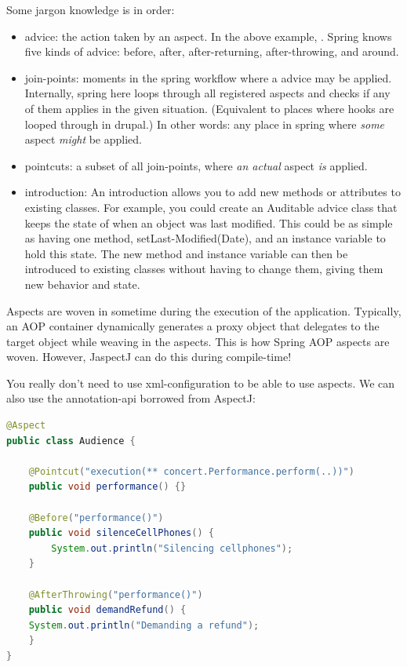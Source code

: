 Some jargon knowledge is in order:
\begin{itemize}
    \item advice: the action taken by an aspect. In the above example, . Spring knows five kinds of advice: before, after, after-returning, after-throwing, and around.
    \item join-points: moments in the spring workflow where a advice may be applied. Internally, spring here loops through all registered aspects and checks if any of them applies in the given situation. (Equivalent to places where hooks are looped through in drupal.) In other words: any place in spring where \emph{some} aspect \emph{might} be applied. 
    \item pointcuts: a subset of all join-points, where \emph{an actual} aspect \emph{is} applied.
    \item introduction: An introduction allows you to add new methods or attributes to existing classes. For
    example, you could create an Auditable advice class that keeps the state of when an object was last modified. This could be as simple as having one method, setLast-Modified(Date), and an instance variable to hold this state. The new method and instance variable can then be introduced to existing classes without having to change them, giving them new behavior and state.
\end{itemize}

Aspects are woven in sometime during the execution of the application. Typically, an AOP container dynamically generates a proxy object that delegates to the target object while weaving in the aspects. This is how Spring AOP aspects are woven. However, JaspectJ can do this during compile-time!

You really don't need to use xml-configuration to be able to use aspects. We can also use the annotation-api borrowed from AspectJ: 

\begin{lstlisting}[language=java]
@Aspect
public class Audience {
	
	@Pointcut("execution(** concert.Performance.perform(..))")
	public void performance() {}

	@Before("performance()")
	public void silenceCellPhones() {
		System.out.println("Silencing cellphones");
	}
	
	@AfterThrowing("performance()")
	public void demandRefund() {
	System.out.println("Demanding a refund");
	}
}
\end{lstlisting}

